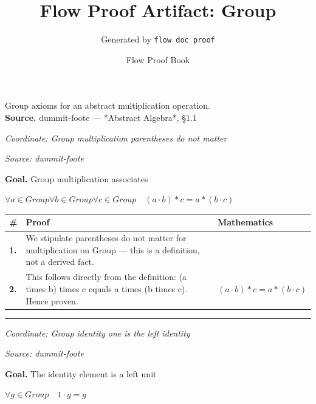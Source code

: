 \documentclass[11pt]{article}
\title{Flow Proof Artifact: Group}
\author{Generated by \texttt{flow doc proof}}
\date{Flow Proof Book}
\theoremstyle{definition}
\begin{document}
\maketitle
Group axioms for an abstract multiplication operation.\\[0.5em]
\textbf{Source.} dummit-foote — *Abstract Algebra*, §1.1\\[0.5em]
\bigskip
{}\par
\smallskip\noindent\textit{Coordinate: Group \cdot multiplication \cdot parentheses do not matter}\par
\smallskip\noindent\textit{Source: dummit-foote}\par
\medskip
\noindent\textbf{Goal.} Group multiplication associates\par
\noindent$\displaystyle \forall a \in Group \forall b \in Group \forall c \in Group\quad (a \cdot b) * c = a * (b \cdot c)$\par
\medskip
\noindent
\begin{tabular}{@{} >{\raggedright\arraybackslash}p{} >{\raggedright\arraybackslash}p{} >{\raggedleft\arraybackslash}p{} @{}}
\textbf{\#} & \textbf{Proof} & \textbf{Mathematics} \\
\midrule
\textbf{1.} & We stipulate parentheses do not matter for multiplication on Group — this is a definition, not a derived fact. & \\[0.45em]
\textbf{2.} & This follows directly from the definition: (a times b) times c equals a times (b times c). Hence proven. & $\displaystyle (a \cdot b) * c = a * (b \cdot c)$ \\[0.45em]
\bottomrule
\end{tabular}
\label{thm:Group-multiplication-parentheses_do_not_matter}
\par\medskip\hrule
\bigskip
{}\par
\smallskip\noindent\textit{Coordinate: Group \cdot identity \cdot one is the left identity}\par
\smallskip\noindent\textit{Source: dummit-foote}\par
\medskip
\noindent\textbf{Goal.} The identity element is a left unit\par
\noindent$\displaystyle \forall g \in Group\quad 1 \cdot g = g$\par
\end{document}
